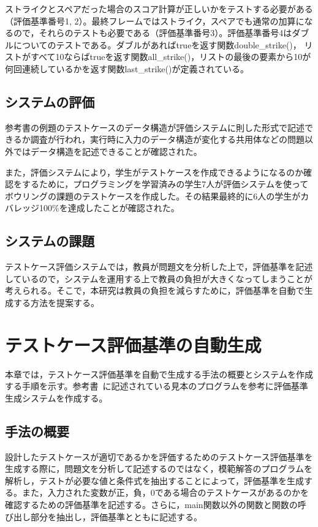 \documentclass{tpu-sotu}
\begin{document}
ストライクとスペアだった場合のスコア計算が正しいかをテストする必要がある（評価基準番号1, 2）。最終フレームではストライク，スペアでも通常の加算になるので，それらのテストも必要である（評価基準番号3）。評価基準番号4はダブルについてのテストである。ダブルがあればtrueを返す関数double\_strike()， リストがすべて10ならばtrueを返す関数all\_strike()，リストの最後の要素から10が何回連続しているかを返す関数last\_strike()が定義されている。
\section{システムの評価}
参考書の例題のテストケースのデータ構造が評価システムに則した形式で記述できるか調査が行われ，実行時に入力のデータ構造が変化する共用体などの問題以外ではデータ構造を記述できることが確認された。

また，評価システムにより，学生がテストケースを作成できるようになるのか確認をするために，プログラミングを学習済みの学生7人が評価システムを使ってボウリングの課題のテストケースを作成した。その結果最終的に6人の学生がカバレッジ100\%を達成したことが確認された。
\section{システムの課題}
テストケース評価システムでは，教員が問題文を分析した上で，評価基準を記述しているので，システムを運用する上で教員の負担が大きくなってしまうことが考えられる。そこで，本研究は教員の負担を減らすために，評価基準を自動で生成する方法を提案する。
\chapter{テストケース評価基準の自動生成}
本章では，テストケース評価基準を自動で生成する手法の概要とシステムを作成する手順を示す。参考書~\cite{b1}に記述されている見本のプログラムを参考に評価基準生成システムを作成する。
\section{手法の概要}
設計したテストケースが適切であるかを評価するためのテストケース評価基準を生成する際に，問題文を分析して記述するのではなく，模範解答のプログラムを解析し，テストが必要な値と条件式を抽出することによって，評価基準を生成する。また，入力された変数が正，負，0である場合のテストケースがあるのかを確認するための評価基準を記述する。さらに，main関数以外の関数と関数の呼び出し部分を抽出し，評価基準とともに記述する。
\end{document}
